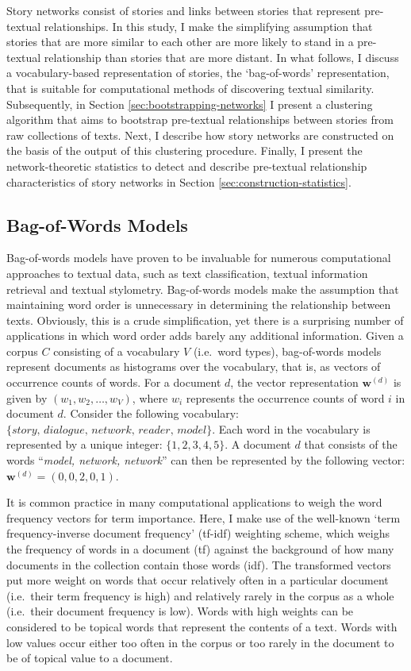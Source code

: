 Story networks consist of stories and links between stories that represent pre-textual relationships. In this study, I make the simplifying assumption that stories that are more similar to each other are more likely to stand in a pre-textual relationship than stories that are more distant. In what follows, I discuss a vocabulary-based representation of stories, the `bag-of-words' representation, that is suitable for computational methods of discovering textual similarity. Subsequently, in Section \ref{sec:bootstrapping-networks} I present a clustering algorithm that aims to bootstrap pre-textual relationships between stories from raw collections of texts. Next, I describe how story networks are constructed on the basis of the output of this clustering procedure. Finally, I present the network-theoretic statistics to detect and describe pre-textual relationship characteristics of story networks in Section \ref{sec:construction-statistics}.

\subsection{Bag-of-Words Models}

Bag-of-words models have proven to be invaluable for numerous computational approaches to textual data, such as text classification, textual information retrieval and textual stylometry. Bag-of-words models make the assumption that maintaining word order is unnecessary in determining the relationship between texts. Obviously, this is a crude simplification, yet there is a surprising number of applications in which word order adds barely any additional information. Given a corpus $C$ consisting of a vocabulary $V$ (i.e.\ word types), bag-of-words models represent documents as histograms over the vocabulary, that is, as vectors of occurrence counts of words. For a document $d$, the vector representation $\mathbf{w}^{(d)}$ is given by $(w_1, w_2, \ldots, w_V)$, where $w_i$ represents the occurrence counts of word $i$ in document $d$. Consider the following vocabulary: $\{\textit{story, dialogue, network, reader, model}\}$. Each word in the vocabulary is represented by a unique integer: $\{1, 2, 3, 4, 5\}$. A document $d$ that consists of the words ``\emph{model, network, network}'' can then be represented by the following vector: $\mathbf{w}^{(d)} = (0, 0, 2, 0, 1)$. 

It is common practice in many computational applications to weigh the word frequency vectors for term importance. Here, I make use of the well-known `term frequency-inverse document frequency' (tf-idf) weighting scheme, which weighs the frequency of words in a document (tf) against the background of how many documents in the collection contain those words (idf)\autocite{manning:2008}. The transformed vectors put more weight on words that occur relatively often in a particular document (i.e.\ their term frequency is high) and relatively rarely in the corpus as a whole (i.e.\ their document frequency is low). Words with high weights can be considered to be topical words that represent the contents of a text. Words with low values occur either too often in the corpus or too rarely in the document to be of topical value to a document. 

